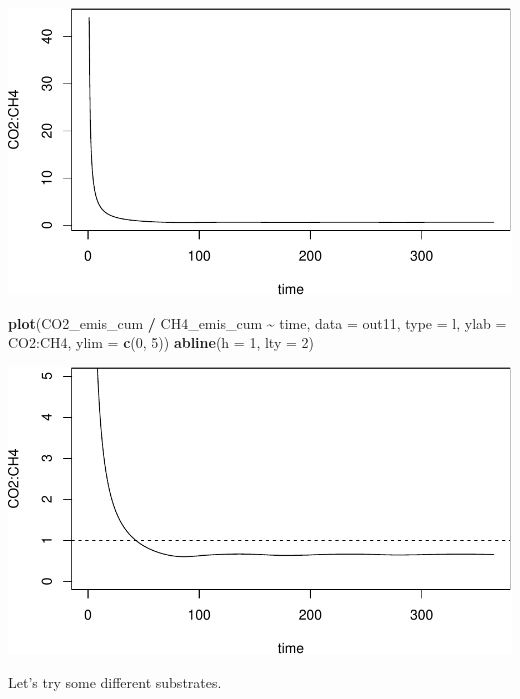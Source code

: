 \documentclass[
]{article}
\newenvironment{Shaded}{\begin{snugshade}}{\end{snugshade}}
\newcommand{\AttributeTok}[1]{\textcolor[rgb]{0.13,0.29,0.53}{#1}}
\newcommand{\DecValTok}[1]{\textcolor[rgb]{0.00,0.00,0.81}{#1}}
\newcommand{\FunctionTok}[1]{\textcolor[rgb]{0.13,0.29,0.53}{\textbf{#1}}}
\newcommand{\NormalTok}[1]{#1}
\newcommand{\SpecialCharTok}[1]{\textcolor[rgb]{0.81,0.36,0.00}{\textbf{#1}}}
\newcommand{\StringTok}[1]{\textcolor[rgb]{0.31,0.60,0.02}{#1}}
\begin{document}
\includegraphics{simple_demo_files/figure-latex/unnamed-chunk-89-1.pdf}

\begin{Shaded}
\begin{Highlighting}[]
\FunctionTok{plot}\NormalTok{(CO2\_emis\_cum }\SpecialCharTok{/}\NormalTok{ CH4\_emis\_cum }\SpecialCharTok{\textasciitilde{}}\NormalTok{ time, }\AttributeTok{data =}\NormalTok{ out11, }\AttributeTok{type =} \StringTok{\textquotesingle{}l\textquotesingle{}}\NormalTok{, }\AttributeTok{ylab =} \StringTok{\textquotesingle{}CO2:CH4\textquotesingle{}}\NormalTok{, }\AttributeTok{ylim =} \FunctionTok{c}\NormalTok{(}\DecValTok{0}\NormalTok{, }\DecValTok{5}\NormalTok{))}
\FunctionTok{abline}\NormalTok{(}\AttributeTok{h =} \DecValTok{1}\NormalTok{, }\AttributeTok{lty =} \DecValTok{2}\NormalTok{)}
\end{Highlighting}
\end{Shaded}

\includegraphics{simple_demo_files/figure-latex/unnamed-chunk-89-2.pdf}

Let's try some different substrates.
\end{document}
